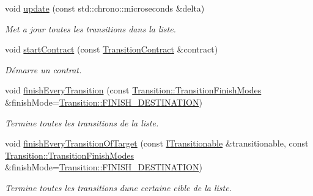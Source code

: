 \begin{DoxyCompactItemize}
\item 
void \hyperlink{classns_transition_1_1_transition_engine_a3bc437b23ee918b9ec4af070e205028f}{update} (const std\+::chrono\+::microseconds \&delta)
\begin{DoxyCompactList}\small\item\em Met a jour toutes les transitions dans la liste. \end{DoxyCompactList}\item 
void \hyperlink{classns_transition_1_1_transition_engine_ae04163c3488c93e111b9d2638a27d6a9}{start\+Contract} (const \hyperlink{classns_transition_1_1_transition_contract}{Transition\+Contract} \&contract)
\begin{DoxyCompactList}\small\item\em Démarre un contrat. \end{DoxyCompactList}\item 
void \hyperlink{classns_transition_1_1_transition_engine_a91235836b50f216b61b5ff3fb31cd5f8}{finish\+Every\+Transition} (const \hyperlink{classns_transition_1_1_transition_a0bf761e331527477ce0c5e496b722a19}{Transition\+::\+Transition\+Finish\+Modes} \&finish\+Mode=\hyperlink{classns_transition_1_1_transition_a0bf761e331527477ce0c5e496b722a19ad32a777c01bab232b51e5eeb31e2b03e}{Transition\+::\+F\+I\+N\+I\+S\+H\+\_\+\+D\+E\+S\+T\+I\+N\+A\+T\+I\+ON})
\begin{DoxyCompactList}\small\item\em Termine toutes les transitions de la liste. \end{DoxyCompactList}\item 
void \hyperlink{classns_transition_1_1_transition_engine_adcd7bce2bb158224303b532c27f9b559}{finish\+Every\+Transition\+Of\+Target} (const \hyperlink{classns_transition_1_1_i_transitionable}{I\+Transitionable} \&transitionable, const \hyperlink{classns_transition_1_1_transition_a0bf761e331527477ce0c5e496b722a19}{Transition\+::\+Transition\+Finish\+Modes} \&finish\+Mode=\hyperlink{classns_transition_1_1_transition_a0bf761e331527477ce0c5e496b722a19ad32a777c01bab232b51e5eeb31e2b03e}{Transition\+::\+F\+I\+N\+I\+S\+H\+\_\+\+D\+E\+S\+T\+I\+N\+A\+T\+I\+ON})
\begin{DoxyCompactList}\small\item\em Termine toutes les transitions d\textquotesingle{}une certaine cible de la liste. \end{DoxyCompactList}\end{DoxyCompactItemize}


